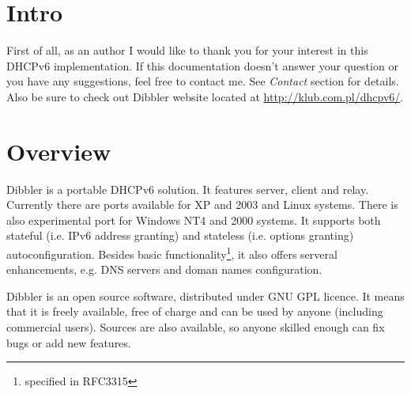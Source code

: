 
\section{Intro}
First of all, as an author I would like to thank you for your interest
in this DHCPv6 implementation. If this documentation doesn't answer
your question or you have any suggestions, feel free to contact
me. See \emph{Contact} section for details. Also be sure to check out
Dibbler website located at \url{http://klub.com.pl/dhcpv6/}.


\section{Overview}

Dibbler is a portable DHCPv6 solution. It features server, client and
relay. Currently there are ports available for XP and 2003
and Linux systems. There is also experimental port for Windows NT4 and
2000 systems. It supports both stateful (i.e. IPv6 address
granting) and stateless (i.e. options granting) autoconfiguration.
Besides basic functionality\footnote{specified in RFC3315}, it also offers
serveral enhancements, e.g. DNS servers and doman names
configuration.

Dibbler is an open source software, distributed under GNU GPL
licence. It means that it is freely available, free of charge and can
be used by anyone (including commercial users). Sources are also
available, so anyone skilled enough can fix bugs or add new features.


